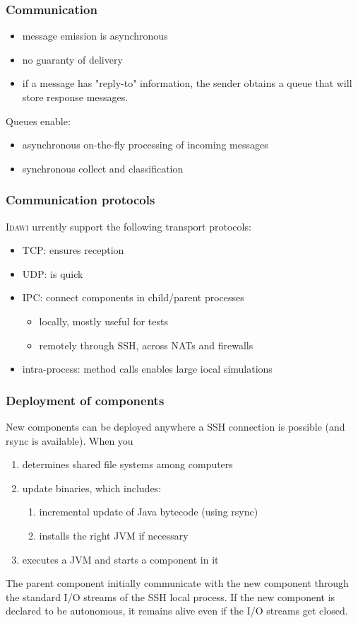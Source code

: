 \documentclass[11pt]{beamer}
\newcommand{\idawi}[1]{\textsc{Idawi}\xspace}
\begin{document}
\begin{frame}
\frametitle{Communication}
\begin{itemize}
	\item message emission is asynchronous
	\item no guaranty of delivery
	\item if a message has "reply-to" information, the sender obtains a queue that will store response messages.
\end{itemize}
Queues enable:
\begin{itemize}
	\item asynchronous on-the-fly  processing of incoming messages
	\item synchronous collect and classification
\end{itemize}
\end{frame}


\begin{frame}
\frametitle{Communication protocols}
\idawi currently support the following transport protocols:
\begin{itemize}
	\item TCP: ensures reception
	\item UDP: is quick
	\item IPC: connect components in child/parent processes
		\begin{itemize}
			\item locally, mostly useful for tests
			\item remotely through SSH, across NATs and firewalls
		\end{itemize}
	\item intra-process: method calls enables large iocal simulations
\end{itemize}
\end{frame}


\begin{frame}
\frametitle{Deployment of components}
New components can be deployed anywhere a SSH connection is possible (and rsync is available). When you 
\begin{enumerate}
	\item determines shared file systems among computers
	\item update binaries, which includes:
		\begin{enumerate}
			\item incremental update of Java  bytecode (using rsync)
			\item installs the right JVM if necessary
		\end{enumerate}
	\item executes a JVM  and starts a component in it
\end{enumerate}
The parent component initially communicate with the new component through the standard I/O streams of the SSH local process. If the new component is declared to be autonomous, it remains alive even if the I/O streams get closed.
\end{frame}
\end{document}
